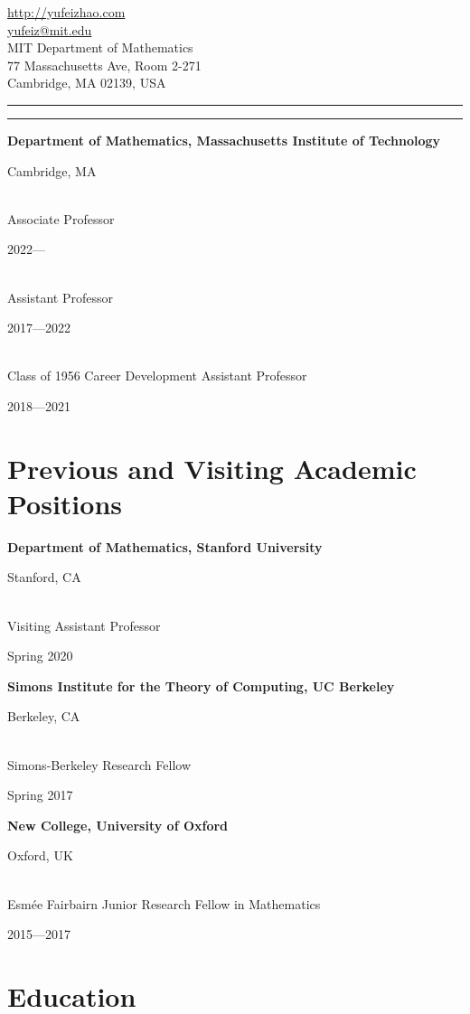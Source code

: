 \documentclass[11pt]{amsart}
\newcommand{\blue}{\color{darkblue}}
\newcommand{\rightloc}[1]{\hfill {\raggedright #1}}
\newcommand{\rightdate}[1]{\hfill {\raggedright #1}}
\newcommand{\p}[1]{{\bfseries #1}}
\newcommand{\q}{\null\quad}
\begin{document}
\thispagestyle{empty}

\parbox{.5\textwidth}{\scalebox{3}{\sffamily\bfseries Yufei Zhao}}
\hfill
\parbox{.5\textwidth}
{  \begin{flushright} \small
\url{http://yufeizhao.com} \\
\url{yufeiz@mit.edu}
\\[2pt] \footnotesize
MIT Department of Mathematics \\
77 Massachusetts Ave, Room 2-271 \\
Cambridge, MA 02139, USA
\end{flushright}
}

\vspace{12pt}

{\blue
\hrule
\vspace{0.02in}
\hrule
\vspace{0.1in}
}


\p{Department of Mathematics, Massachusetts Institute of Technology} \rightloc{Cambridge, MA} \\
	\q Associate Professor 
		\rightdate{2022---\phantom{2022}} \\
	\q Assistant Professor
		\rightdate{2017---2022} \\
	\q Class of 1956 Career Development Assistant Professor
		\rightdate{2018---2021}
	
\section*{Previous and Visiting Academic Positions}

\p{Department of Mathematics, Stanford University} \rightloc{Stanford, CA} \\
	\q Visiting Assistant Professor \rightdate{Spring 2020}

\textbf{Simons Institute for the Theory of Computing, UC Berkeley} \rightloc{Berkeley, CA} \\
	\q Simons-Berkeley Research Fellow 
		\rightdate{Spring 2017}

\p{New College, University of Oxford} \rightloc{Oxford, UK} \\
	\q Esm\'ee Fairbairn Junior Research Fellow in Mathematics  
		\rightdate{2015---2017}

\section*{Education}
\end{document}

